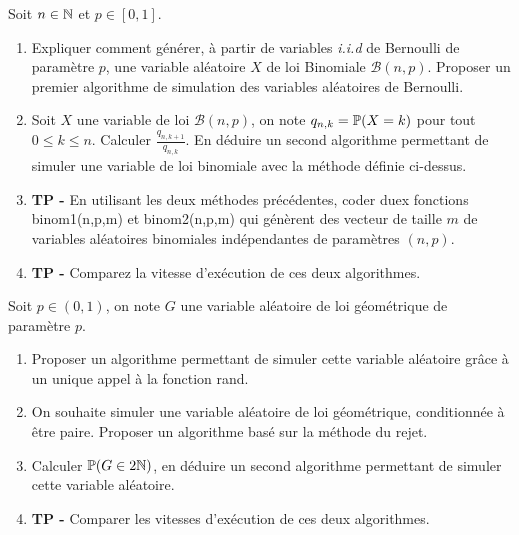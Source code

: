 \documentclass{exercices}
\begin{document}
\begin{exercice}
Soit $n \in \N$ et $p \in [0,1]$.
\begin{enumerate}
  \item Expliquer comment g\'en\'erer, à partir de variables \textit{i.i.d} de Bernoulli de paramètre $p$, une variable al\'eatoire $X$ de loi Binomiale $\mathcal{B}(n,p)$. Proposer un premier algorithme de simulation des variables aléatoires de Bernoulli.
  \item Soit $X$ une variable de loi $\mathcal{B}(n,p)$, on note $q_{n,k} = \P(X = k)$ pour tout $0 \leq k \leq n$. Calculer $\frac{q_{n,k+1}}{q_{n,k}}$. En déduire un second algorithme permettant de simuler une variable de loi binomiale avec la méthode définie ci-dessus.
\item \textbf{TP -}  En utilisant les deux méthodes précédentes, coder duex fonctions binom1(n,p,m) et binom2(n,p,m) qui génèrent des vecteur de taille $m$ de variables aléatoires binomiales indépendantes de paramètres $(n,p)$.
\item \textbf{TP -} Comparez la vitesse d'exécution de ces deux algorithmes.
\end{enumerate}
\end{exercice}


\begin{exercice}
Soit $p \in (0,1)$, on note $G$ une variable aléatoire de loi géométrique de paramètre $p$.
\begin{enumerate}
  \item Proposer un algorithme permettant de simuler cette variable aléatoire grâce à un unique appel à la fonction rand.
  \item On souhaite simuler une variable aléatoire de loi géométrique, conditionnée à être paire. Proposer un algorithme basé sur la méthode du rejet.
  \item Calculer $\P(G \in 2 \N)$, en déduire un second algorithme permettant de simuler cette variable aléatoire.
  \item \textbf{TP -} Comparer les vitesses d'exécution de ces deux algorithmes.
\end{enumerate}
\end{exercice}
\end{document}
